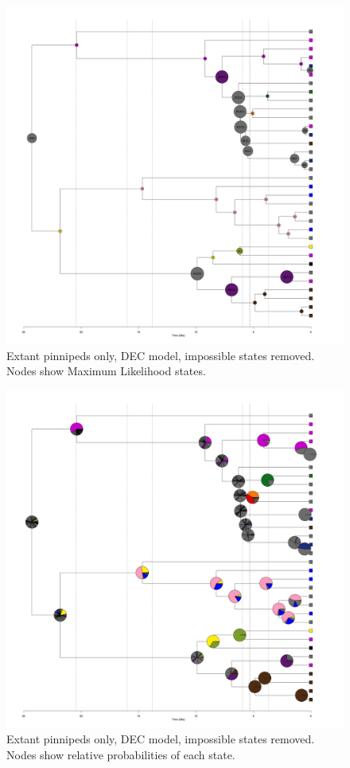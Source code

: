 \documentclass[a4paper, 12pt]{article}
\begin{document}
\begin{figure}[H]
 \centering
  \includegraphics[width = \linewidth]{figures/extant-pinnipeds-DEC-impossible-MLstates.png}
  \caption{Extant pinnipeds only, DEC model, impossible states removed. Nodes show Maximum Likelihood states.}
  \label{fig-extant-dec-ml}
\end{figure} 

\begin{figure}[H]
 \centering
  \includegraphics[width = \linewidth]{figures/extant-pinnipeds-DEC-impossible-pies.png}
  \caption{Extant pinnipeds only, DEC model, impossible states removed. Nodes show relative probabilities of each state.}
  \label{fig-extant-dec-pie}
\end{figure} 
\end{document}
